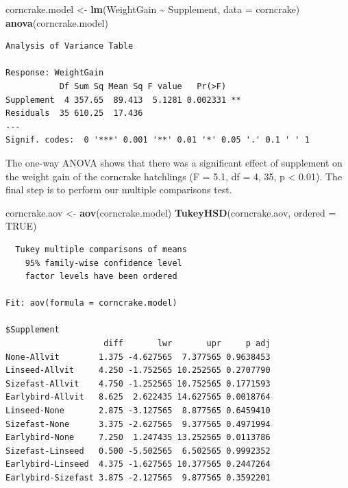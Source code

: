 \documentclass[
]{book}
\newenvironment{Shaded}{\begin{snugshade}}{\end{snugshade}}
\newcommand{\DataTypeTok}[1]{\textcolor[rgb]{0.13,0.29,0.53}{#1}}
\newcommand{\KeywordTok}[1]{\textcolor[rgb]{0.13,0.29,0.53}{\textbf{#1}}}
\newcommand{\NormalTok}[1]{#1}
\newcommand{\OperatorTok}[1]{\textcolor[rgb]{0.81,0.36,0.00}{\textbf{#1}}}
\newcommand{\OtherTok}[1]{\textcolor[rgb]{0.56,0.35,0.01}{#1}}
\newcommand{\StringTok}[1]{\textcolor[rgb]{0.31,0.60,0.02}{#1}}
\begin{document}
\begin{Shaded}
\begin{Highlighting}[]
\NormalTok{corncrake.model \textless{}{-}}\StringTok{ }\KeywordTok{lm}\NormalTok{(WeightGain }\OperatorTok{\textasciitilde{}}\StringTok{ }\NormalTok{Supplement, }\DataTypeTok{data =}\NormalTok{ corncrake)}
\KeywordTok{anova}\NormalTok{(corncrake.model)}
\end{Highlighting}
\end{Shaded}

\begin{verbatim}
Analysis of Variance Table

Response: WeightGain
           Df Sum Sq Mean Sq F value   Pr(>F)   
Supplement  4 357.65  89.413  5.1281 0.002331 **
Residuals  35 610.25  17.436                    
---
Signif. codes:  0 '***' 0.001 '**' 0.01 '*' 0.05 '.' 0.1 ' ' 1
\end{verbatim}

The one-way ANOVA shows that there was a significant effect of supplement on the weight gain of the corncrake hatchlings (F = 5.1, df = 4, 35, p \textless{} 0.01). The final step is to perform our multiple comparisons test.

\begin{Shaded}
\begin{Highlighting}[]
\NormalTok{corncrake.aov \textless{}{-}}\StringTok{ }\KeywordTok{aov}\NormalTok{(corncrake.model)}
\KeywordTok{TukeyHSD}\NormalTok{(corncrake.aov, }\DataTypeTok{ordered =} \OtherTok{TRUE}\NormalTok{)}
\end{Highlighting}
\end{Shaded}

\begin{verbatim}
  Tukey multiple comparisons of means
    95% family-wise confidence level
    factor levels have been ordered

Fit: aov(formula = corncrake.model)

$Supplement
                    diff       lwr       upr     p adj
None-Allvit        1.375 -4.627565  7.377565 0.9638453
Linseed-Allvit     4.250 -1.752565 10.252565 0.2707790
Sizefast-Allvit    4.750 -1.252565 10.752565 0.1771593
Earlybird-Allvit   8.625  2.622435 14.627565 0.0018764
Linseed-None       2.875 -3.127565  8.877565 0.6459410
Sizefast-None      3.375 -2.627565  9.377565 0.4971994
Earlybird-None     7.250  1.247435 13.252565 0.0113786
Sizefast-Linseed   0.500 -5.502565  6.502565 0.9992352
Earlybird-Linseed  4.375 -1.627565 10.377565 0.2447264
Earlybird-Sizefast 3.875 -2.127565  9.877565 0.3592201
\end{verbatim}
\end{document}
